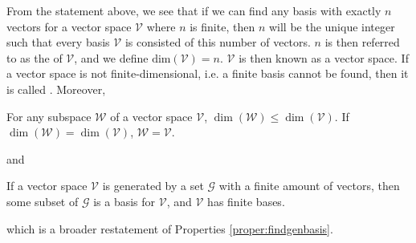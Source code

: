 From the statement above, we see that if we can find any basis with exactly $n$ vectors for a vector space $\mathcal{V}$ where $n$ is finite, then $n$ will be the unique integer such that every basis $\mathcal{V}$ is consisted of this number of vectors. $n$ is then referred to as the  of $\mathcal{V}$, and we define $\text{dim}(\mathcal{V}) = n$. $\mathcal{V}$ is then known as a  vector space. If a vector space is not finite-dimensional, i.e. a finite basis cannot be found, then it is called . Moreover,
\begin{proper}
\label{proper:dimWleqV}
For any subspace $\mathcal{W}$ of a vector space $\mathcal{V}$, $\dim(\mathcal{W}) \leq \dim(\mathcal{V})$. If $\dim(\mathcal{W}) = \dim(\mathcal{V})$, $\mathcal{W} = \mathcal{V}$.
\end{proper}
and
\begin{thm}
\label{thm:finitebasissubset}
If a vector space $\mathcal{V}$ is generated by a set $\mathcal{G}$ with a finite amount of vectors, then some subset of $\mathcal{G}$ is a basis for $\mathcal{V}$, and $\mathcal{V}$ has finite bases.
\end{thm}
which is a broader restatement of Properties \ref{proper:findgenbasis}.

